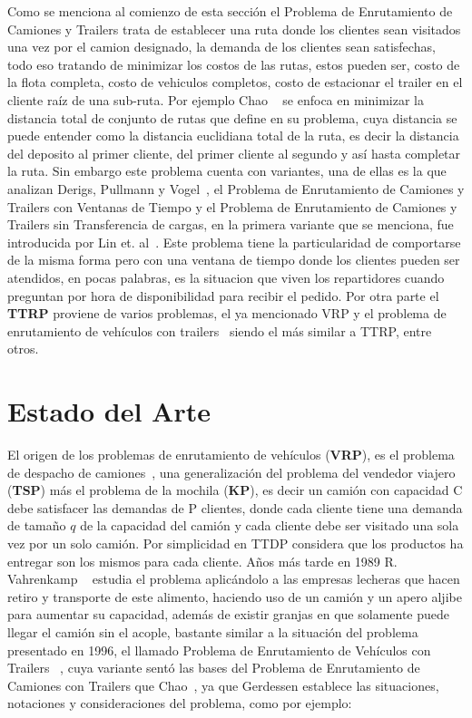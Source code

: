 \documentclass[letter, 10pt]{article}
\begin{document}
Como se menciona al comienzo de esta secci\'on el Problema de Enrutamiento de Camiones y Trailers trata de establecer una ruta donde los clientes sean visitados una vez por el camion designado, la demanda de los clientes sean satisfechas, todo eso tratando de minimizar los costos de las rutas, estos pueden ser, costo de la flota completa, costo de vehiculos completos, costo de estacionar el trailer en el cliente raíz de una sub-ruta. Por ejemplo Chao ~\cite{Chao} se enfoca en minimizar la distancia total de conjunto de rutas que define en su problema, cuya distancia se puede entender como la distancia euclidiana total de la ruta, es decir la distancia del deposito al primer cliente, del primer cliente al segundo y así hasta completar la ruta. Sin embargo este problema cuenta con variantes, una de ellas es la que analizan Derigs, Pullmann y Vogel~\cite{UDerigs}, el Problema de Enrutamiento de Camiones y Trailers con Ventanas de Tiempo y el Problema de Enrutamiento de Camiones y Trailers sin Transferencia de cargas, en la primera variante que se menciona, fue introducida por Lin et. al~\cite{TTRPTW}. Este problema tiene la particularidad de comportarse de la misma forma pero con una ventana de tiempo donde los clientes pueden ser atendidos, en pocas palabras, es la situacion que viven los repartidores cuando preguntan por hora de disponibilidad para recibir el pedido. Por otra parte el \textbf{TTRP} proviene de varios problemas, el ya mencionado VRP y el problema de enrutamiento de veh\'iculos con trailers~\cite{Gerdessen} siendo el más similar a TTRP, entre otros.

\section{Estado del Arte}
El origen de los problemas de enrutamiento de veh\'iculos (\textbf{VRP}), es el problema de despacho de camiones~\cite{TTDP}, una generalizaci\'on del problema del vendedor viajero (\textbf{TSP}) más el problema de la mochila (\textbf{KP}),  es decir un camión con capacidad C debe satisfacer las demandas de P clientes, donde cada cliente tiene una demanda de tamaño $q$ de la capacidad del camión y cada cliente debe ser visitado una sola vez por un solo camión. Por simplicidad en TTDP considera que los productos ha entregar son los mismos para cada cliente. Años más tarde en 1989 R. Vahrenkamp ~\cite{Vahrenmap} estudia el problema aplicándolo a las empresas lecheras que hacen retiro y transporte de este alimento, haciendo uso de un camión y un apero aljibe para aumentar  su capacidad, además de existir granjas en que solamente puede llegar el camión sin el acople, bastante similar a la situación del problema presentado en 1996, el llamado Problema de Enrutamiento de Vehículos con Trailers ~\cite{Gerdessen}, cuya variante sentó las bases del Problema de Enrutamiento de Camiones con Trailers que Chao~\cite{Chao}, ya que Gerdessen establece las situaciones, notaciones y consideraciones del problema, como por ejemplo:
\end{document}
